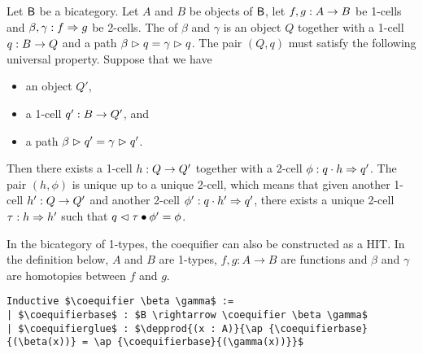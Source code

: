 \begin{definition}
Let $\mathsf{B}$ be a bicategory. Let $A$ and $B$ be objects of $\mathsf{B}$, let $f,
g : A \rightarrow B$ be 1-cells and $\beta,\gamma : f \Rightarrow
g$ be 2-cells. The  of $\beta$ and $\gamma$ is an object $Q$
together with a 1-cell $q : B \rightarrow Q$ and a path
$\beta \vartriangleright q = \gamma \vartriangleright q$.
The pair $(Q,q)$ must satisfy the following universal
property. Suppose that we have
\begin{itemize}
\item an object $Q'$,
\item a 1-cell $q' : B \rightarrow Q'$, and
\item a path $\beta \vartriangleright q' = \gamma \vartriangleright q'$.
\end{itemize}
Then there exists a 1-cell $h : Q \rightarrow Q'$ together with a 2-cell
$\phi : q \cdot h \Rightarrow q'$. The pair $(h,\phi)$ is unique up to a unique 2-cell, which means that
given another 1-cell $h' : Q \rightarrow Q'$ and another 2-cell $\phi' :
q \cdot h' \Rightarrow q'$, there exists a unique 2-cell $\tau : h
\Rightarrow h'$ such that $q \vartriangleleft \tau \bullet \phi' = \phi$.
\end{definition}

In the bicategory of 1-types, the coequifier can also be constructed as a HIT. In
the definition below, $A$ and $B$ are 1-types, $f , g: A \to B$ are
functions and $\beta$ and $\gamma$ are homotopies between $f$ and $g$.
\begin{lstlisting}[mathescape=true]
Inductive $\coequifier \beta \gamma$ :=
| $\coequifierbase$ : $B \rightarrow \coequifier \beta \gamma$
| $\coequifierglue$ : $\depprod{(x : A)}{\ap {\coequifierbase}{(\beta(x))} = \ap {\coequifierbase}{(\gamma(x))}}$
\end{lstlisting}

